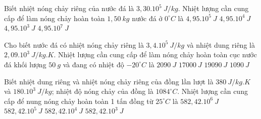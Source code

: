 \begin{ex}
	Biết nhiệt nóng chảy riêng của nước đá là $3,30.10^5\ J/kg$. Nhiệt lượng cần cung cấp để làm nóng chảy hoàn toàn $1,50\ kg$ nước đá ở $0^\circ C$ là
	\choice
	{\True $4,95.10^5\ J$}
	{$4,95.10^4\ J$}
	{$4,95.10^3\ J$}
	{$4,95.10^7\ J$}
	\end{ex}
\begin{ex}
	 Cho biết nước đá có nhiệt nóng chảy riêng là $3,4 . 10^{5} \ J /kg$ và nhiệt dung riêng là $2,09 . 10^3 \ J / kg . K$. Nhiệt lượng cần cung cấp để làm nóng chảy hoàn toàn cục nước đá khối lượng $50 \ g$ và đang có nhiệt độ $-20^\circ C$ là
	\choice
	{$2090\ J$}
	{$17000 \ J$}
	{\True $19090 \ J$}
	{$1090 \ J$}
	\end{ex}


\begin{ex}
	 Biết nhiệt dung riêng và nhiệt nóng chảy riêng của đồng lần lượt là $380 \ J / kg . K$ và $180.10^3 \ J /kg$; nhiệt độ nóng chảy của đồng là $1084^\circ C$. Nhiệt lượng cần cung cấp để nung nóng chảy hoàn toàn 1 tấn đồng từ $25^\circ C$ là
	\choice
	{\True $582,42.10^{6} \ J$}
	{$582,42.10^{5} \ J$}
	{$582,42.10^{4} \ J$}
	{$582,42.10^{3} \ J$}
	\end{ex}

